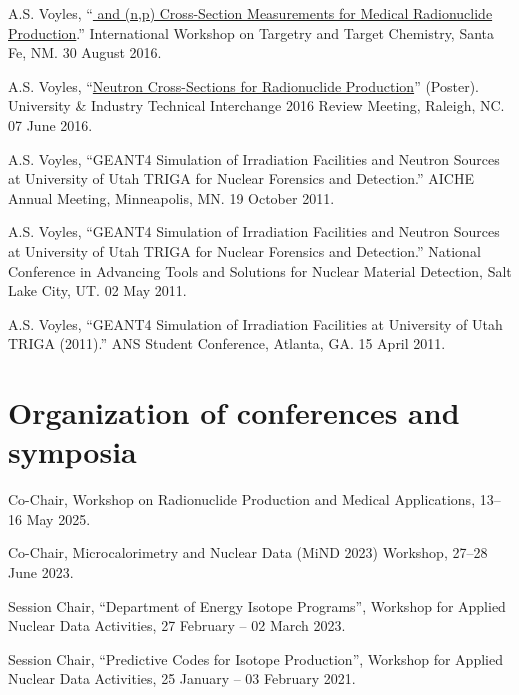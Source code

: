 \begin{bibsection}
\item A.S. Voyles, \enquote{\href{https://slideslive.com/38898186/64cu-and-47scnp-crosssection-measurements-for-medical-radionuclide-production}{ and  (n,p) Cross-Section Measurements for Medical Radionuclide Production}.}  International Workshop on Targetry and Target Chemistry, Santa Fe, NM. 30 August 2016.

\item A.S. Voyles, \enquote{\href{https://github.com/avoyles/posters/blob/master/2016-06-07-UITI/Voyles_UITI2016_Poster_OsloUpdate.pdf}{Neutron Cross-Sections for Radionuclide Production}} (Poster).  University \& Industry Technical Interchange 2016 Review Meeting, Raleigh, NC. 07 June 2016.

\item A.S. Voyles, \enquote{GEANT4 Simulation of Irradiation Facilities and Neutron Sources at University of Utah TRIGA for
Nuclear Forensics and Detection.}  AICHE Annual Meeting, Minneapolis, MN. 19 October 2011.

\item A.S. Voyles, \enquote{GEANT4 Simulation of Irradiation Facilities and Neutron Sources at University of Utah TRIGA for
Nuclear Forensics and Detection.}   National Conference in Advancing Tools and Solutions for
Nuclear Material Detection, Salt Lake City, UT. 02 May 2011.

\item A.S. Voyles, \enquote{GEANT4 Simulation of Irradiation Facilities at University of Utah TRIGA (2011).} 
ANS Student Conference, Atlanta, GA. 15 April 2011.

\end{bibsection}


\section{\sc Organization of conferences and symposia}

\begin{list2}

\item Co-Chair,  Workshop on Radionuclide Production and Medical Applications,  13--16 May 2025.


\item Co-Chair,  Microcalorimetry and Nuclear Data (MiND 2023) Workshop,  27--28 June 2023.

\item Session Chair, \enquote{Department of Energy Isotope Programs}, Workshop for Applied Nuclear Data Activities,  27 February -- 02 March 2023.

\item Session Chair, \enquote{Predictive Codes for Isotope Production}, Workshop for Applied Nuclear Data Activities,  25 January -- 03 February 2021.

\end{list2}

